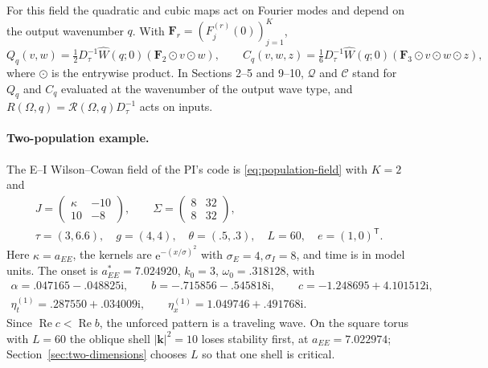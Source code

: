 \documentclass[11pt]{article}
\newcommand{\ii}{\mathrm{i}}
\newcommand{\ee}{\mathrm{e}}
\newcommand{\cQ}{\mathcal{Q}}
\newcommand{\cC}{\mathcal{C}}
\newcommand{\cR}{\mathcal{R}}
\DeclareMathOperator{\RePart}{Re}
\begin{document}
For this field the quadratic and cubic maps act on Fourier modes and depend
on the output wavenumber $q$. With $\boldsymbol F_r=(F_j^{(r)}(0))_{j=1}^K$,
\begin{equation}
 Q_q(v,w)=\tfrac12D_\tau^{-1}\widehat W(q;0)
                    (\boldsymbol F_2\odot v\odot w),\qquad
 C_q(v,w,z)=\tfrac16D_\tau^{-1}\widehat W(q;0)
                    (\boldsymbol F_3\odot v\odot w\odot z),
 \label{eq:population-nonlinear-symbols}
\end{equation}
where $\odot$ is the entrywise product. In Sections 2--5 and 9--10, $\cQ$ and
$\cC$ stand for $Q_q$ and $C_q$ evaluated at the wavenumber of the output
wave type, and $R(\Omega,q)=\cR(\Omega,q)D_\tau^{-1}$ acts on inputs.

\paragraph{Two-population example.}
The E--I Wilson--Cowan field of the PI's code is \eqref{eq:population-field}
with $K=2$ and
\begin{equation}
 \begin{gathered}
 J=\begin{pmatrix}\kappa&-10\\10&-8\end{pmatrix},\qquad
 \Sigma=\begin{pmatrix}8&32\\8&32\end{pmatrix},\\
 \tau=(3,6.6),\quad g=(4,4),\quad\theta=(.5,.3),\quad L=60,\quad e=(1,0)^{\mathsf T}.
 \end{gathered}
 \label{eq:wc-parameters}
\end{equation}
Here $\kappa=a_{EE}$, the kernels are $\ee^{-(x/\sigma)^2}$ with
$\sigma_E=4,\sigma_I=8$, and time is in model units. The onset is
$a_{EE}^*=7.024920$, $k_0=3$, $\omega_0=.318128$, with
\begin{equation}
 \begin{gathered}
 \alpha=.047165-.048825\ii,\qquad b=-.715856-.545818\ii,\qquad c=-1.248695+4.101512\ii,\\
 \eta_t^{(1)}=.287550+.034009\ii,\qquad \eta_x^{(1)}=1.049746+.491768\ii.
 \end{gathered}
 \label{eq:wc-coefficients}
\end{equation}
Since $\RePart c<\RePart b$, the unforced pattern is a traveling wave. On the
square torus with $L=60$ the oblique shell $|\boldsymbol k|^2=10$ loses
stability first, at $a_{EE}=7.022974$; Section~\ref{sec:two-dimensions}
chooses $L$ so that one shell is critical.
\end{document}
